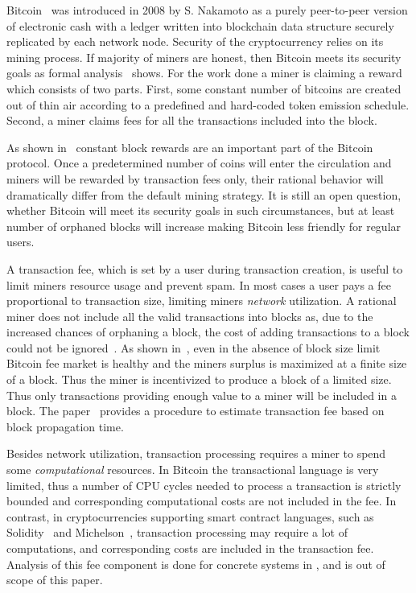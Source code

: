 \documentclass[]{llncs}   %
\begin{document}
Bitcoin~\cite{Nakamoto2008} was introduced in 2008 by S. Nakamoto as a purely
peer-to-peer version of electronic cash with a ledger written into blockchain
data structure securely replicated by each network node. Security of the cryptocurrency 
relies on its mining process. If majority of miners are honest, then Bitcoin
meets its security goals as formal analysis~\cite{Garay2015} shows. For the work
done a miner is claiming a reward which consists of two parts. First, some
constant number of bitcoins are created out of thin air according to a
predefined and hard-coded token emission schedule. Second, a miner claims fees
for all the transactions included into the block.

As shown in~\cite{carlsten2016instability} constant block rewards are an important
part of the Bitcoin protocol. Once a predetermined number of coins will enter the circulation
and miners will be rewarded by transaction fees only, their rational behavior will
dramatically differ from the default mining strategy. It is still an open question, whether
Bitcoin will meet its security goals in such circumstances, but at least number of
orphaned blocks will increase making Bitcoin less friendly for regular users.

A transaction fee, which is set by a user during transaction creation, is
useful to limit miners resource usage and prevent spam. In most cases a user pays a fee proportional to transaction size,
limiting miners {\em network} utilization. A rational miner does not
include all the valid transactions into blocks as, due to the increased
chances of orphaning a block, the cost of adding transactions to a block
could not be ignored~\cite{andersen2013,rizun2015transaction}. As shown
in~\cite{rizun2015transaction}, even in the absence of block size limit
Bitcoin fee market is healthy and the miners surplus is maximized at a
finite size of a block. Thus the miner is incentivized to produce
a block of a limited size. Thus only transactions providing enough value to a miner will be included in a block. The 
paper~\cite{rizun2015transaction} provides a procedure to estimate
transaction fee based on block propagation time.

Besides network utilization, transaction processing requires a miner
to spend some {\em computational} resources.
In Bitcoin the transactional language\cite{script} is very limited, thus
a number of CPU cycles needed to process a transaction
is strictly bounded and corresponding computational costs are not included in the fee.
In contrast, in cryptocurrencies supporting smart contract
languages, such as Solidity~\cite{solidity} and Michelson~\cite{tezosScript},
transaction processing may require a lot of computations, and
corresponding costs are included in the transaction fee. Analysis of this fee component is done for concrete systems
in \cite{Earlz2017,luu2015demystifying}, and is out of scope of this paper.
\end{document}
